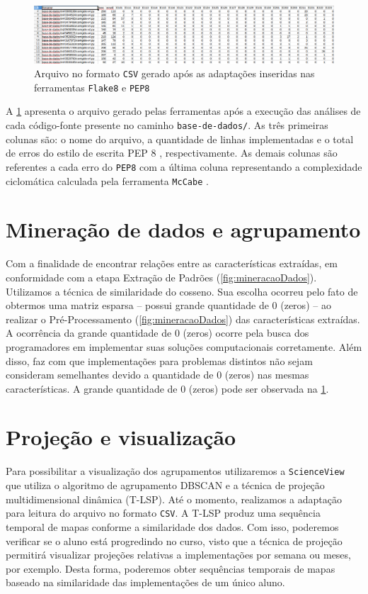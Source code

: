 		\begin{figure}[h]
			\centering
			\includegraphics[width=1\linewidth]{imagem/arquivoCSV}
			\caption{Arquivo no formato \texttt{CSV} gerado após as adaptações inseridas nas ferramentas \texttt{Flake8} e \texttt{PEP8}}
			\label{fig:arquivoCSV}
		\end{figure}
		
		A \cref{fig:arquivoCSV} apresenta o arquivo gerado pelas ferramentas após a
		execução das análises de cada código-fonte presente no caminho \texttt{base-de-dados/}.
		As três primeiras colunas são: o nome do arquivo, a quantidade de linhas implementadas
		e o total de erros do estilo de escrita PEP 8 \cite{van2001pep}, respectivamente. As
		demais colunas são referentes a cada erro do \texttt{PEP8} \cite{pep8} com a última
		coluna representando a complexidade ciclomática calculada pela ferramenta
		\texttt{McCabe} \cite{mccabe}.

	\section{Mineração de dados e agrupamento}
		Com a finalidade de encontrar relações entre as características extraídas, em
		conformidade com a etapa Extração de Padrões (\cref{fig:mineracaoDados}).
		Utilizamos a técnica de similaridade do cosseno. Sua escolha ocorreu pelo fato de obtermos
		uma matriz esparsa -- possui grande quantidade de 0 (zeros) -- ao realizar o
		Pré-Processamento (\cref{fig:mineracaoDados}) das características extraídas. A
		ocorrência da grande quantidade de 0 (zeros) ocorre pela busca dos programadores
		em implementar suas soluções computacionais corretamente. Além disso, faz com que
		implementações para problemas distintos não sejam consideram semelhantes devido a
		quantidade de 0 (zeros) nas mesmas características. A grande quantidade de 0 (zeros)
		pode ser observada na \cref{fig:arquivoCSV}.
	
	\section{Projeção e visualização}
		Para possibilitar a visualização dos agrupamentos utilizaremos a \texttt{ScienceView}
		\cite{Alencar-etal:2012} que utiliza o algoritmo de agrupamento DBSCAN \cite{Ester1996}
		e a técnica de projeção multidimensional dinâmica 
		(T-LSP). Até o momento, realizamos a adaptação para leitura do arquivo no formato
		\texttt{CSV}. A T-LSP produz uma sequência temporal de mapas conforme a similaridade
		dos dados. Com isso, poderemos verificar se o aluno está progredindo no curso, visto
		que a técnica de projeção permitirá visualizar projeções relativas a implementações
		por semana ou meses, por exemplo. Desta forma, poderemos obter sequências temporais
		de mapas baseado na similaridade das implementações de um único aluno.
		
